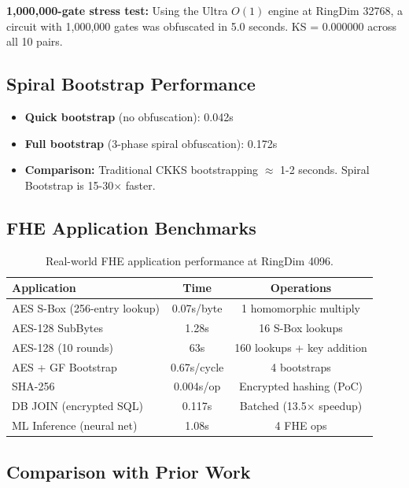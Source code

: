 \documentclass[11pt,a4paper]{article}
\begin{document}
\textbf{1,000,000-gate stress test:} Using the Ultra $O(1)$ engine at RingDim 32768, a circuit with 1,000,000 gates was obfuscated in 5.0 seconds. KS = 0.000000 across all 10 pairs.

\subsection{Spiral Bootstrap Performance}

\begin{itemize}[nosep]
    \item \textbf{Quick bootstrap} (no obfuscation): 0.042s
    \item \textbf{Full bootstrap} (3-phase spiral obfuscation): 0.172s
    \item \textbf{Comparison:} Traditional CKKS bootstrapping $\approx$ 1-2 seconds. Spiral Bootstrap is 15-30$\times$ faster.
\end{itemize}

\subsection{FHE Application Benchmarks}

\begin{table}[h]
\centering
\begin{tabular}{lcc}
\toprule
\textbf{Application} & \textbf{Time} & \textbf{Operations} \\
\midrule
AES S-Box (256-entry lookup) & 0.07s/byte & 1 homomorphic multiply \\
AES-128 SubBytes & 1.28s & 16 S-Box lookups \\
AES-128 (10 rounds) & 63s & 160 lookups + key addition \\
AES + GF Bootstrap & 0.67s/cycle & 4 bootstraps \\
SHA-256 & 0.004s/op & Encrypted hashing (PoC) \\
DB JOIN (encrypted SQL) & 0.117s & Batched (13.5$\times$ speedup) \\
ML Inference (neural net) & 1.08s & 4 FHE ops \\
\bottomrule
\end{tabular}
\caption{Real-world FHE application performance at RingDim 4096.}
\label{tab:apps}
\end{table}

\subsection{Comparison with Prior Work}
\end{document}
